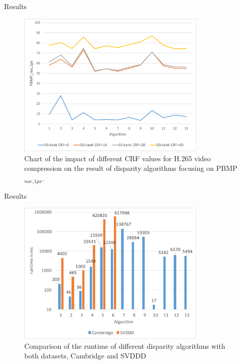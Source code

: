 \documentclass[10pt]{beamer}
\begin{document}
\begin{frame}[fragile]{Results}
  \begin{figure}[h!]
  \centering
  \includegraphics[width=0.8\textwidth]{../paper/src/images/evaluation/plots/03-tank-pbmp-noc-1-vc.pdf}
  \caption[Chart of the impact of video compression]{Chart of the impact of different CRF values for H.265 video compression on the result of disparity algorithms focusing on PBMP$_{noc,1px}$.}
  \label{fig:eval-plots-pbmp-noc1-vc}
  \end{figure}
\end{frame}

\begin{frame}[fragile]{Results}
  \begin{figure}[h!]
  \centering
  \includegraphics[width=0.8\textwidth]{../paper/src/images/evaluation/plots/runtime.pdf}
  \caption[Comparison of the runtime of different disparity algorithms]{Comparison of the runtime of different disparity algorithms with both datasets, Cambridge and SVDDD}
  \label{fig:eval-plots-runtime}
  \end{figure}
\end{frame}
\end{document}

